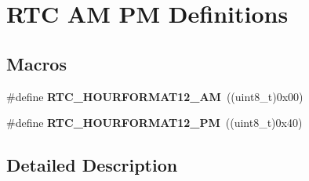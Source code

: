 \hypertarget{group___r_t_c___a_m___p_m___definitions}{}\section{R\+TC AM PM Definitions}
\label{group___r_t_c___a_m___p_m___definitions}
\subsection*{Macros}
\begin{DoxyCompactItemize}
\item 
\mbox{\label{group___r_t_c___a_m___p_m___definitions_ga5be28b0dd8d5d12a6b055a70c46ce24a}} 
\#define {\bfseries R\+T\+C\+\_\+\+H\+O\+U\+R\+F\+O\+R\+M\+A\+T12\+\_\+\+AM}~((uint8\+\_\+t)0x00)
\item 
\mbox{\label{group___r_t_c___a_m___p_m___definitions_gae8662cf2f3080b992d3b119f74f60162}} 
\#define {\bfseries R\+T\+C\+\_\+\+H\+O\+U\+R\+F\+O\+R\+M\+A\+T12\+\_\+\+PM}~((uint8\+\_\+t)0x40)
\end{DoxyCompactItemize}


\subsection{Detailed Description}
